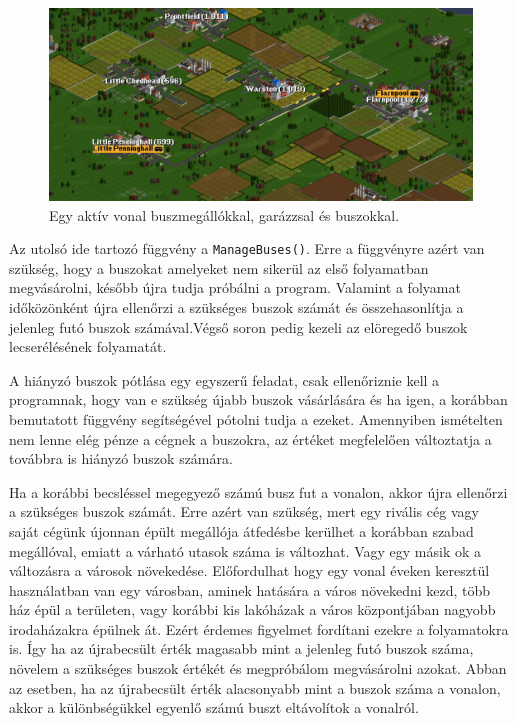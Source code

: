 \begin{figure}
	\centering
	\includegraphics[scale=0.45]{images/vonal.png}
	\caption{Egy aktív vonal buszmegállókkal, garázzsal és buszokkal.}
	\label{fig:vonal}
\end{figure}

Az utolsó ide tartozó függvény a \texttt{ManageBuses()}. Erre a függvényre azért van szükség, hogy a buszokat amelyeket nem sikerül az első folyamatban megvásárolni, később újra tudja próbálni a program. Valamint a folyamat időközönként újra ellenőrzi a szükséges buszok számát és összehasonlítja a jelenleg futó buszok számával.Végső soron pedig kezeli az elöregedő buszok lecserélésének folyamatát.

A hiányzó buszok pótlása egy egyszerű feladat, csak ellenőriznie kell a programnak, hogy van e szükség újabb buszok vásárlására és ha igen, a korábban bemutatott függvény segítségével pótolni tudja a ezeket. Amennyiben ismételten nem lenne elég pénze a cégnek a buszokra, az értéket megfelelően változtatja a továbbra is hiányzó buszok számára.

Ha a korábbi becsléssel megegyező számú busz fut a vonalon, akkor újra ellenőrzi a szükséges buszok számát. Erre azért van szükség, mert egy rivális cég vagy saját cégünk újonnan épült megállója átfedésbe kerülhet a korábban szabad megállóval, emiatt a várható utasok száma is változhat. Vagy egy másik ok a változásra a városok növekedése. Előfordulhat hogy egy vonal éveken keresztül használatban van egy városban, aminek hatására a város növekedni kezd, több ház épül a területen, vagy korábbi kis lakóházak a város központjában nagyobb irodaházakra épülnek át. Ezért érdemes figyelmet fordítani ezekre a folyamatokra is. Így ha az újrabecsült érték magasabb mint a jelenleg futó buszok száma, növelem a szükséges buszok értékét és megpróbálom megvásárolni azokat. Abban az esetben, ha az újrabecsült érték alacsonyabb mint a buszok száma a vonalon, akkor a különbségükkel egyenlő számú buszt eltávolítok a vonalról.

